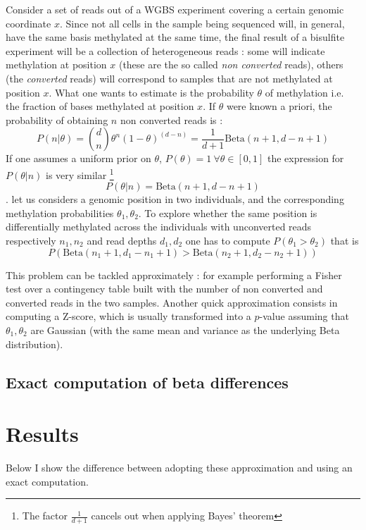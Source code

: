 \documentclass[11pt]{amsart}
\begin{document}
Consider a set of reads out of a WGBS experiment covering a certain genomic coordinate $x$. Since not all cells in the sample being sequenced will, in general,  have the same basis methylated at the same time, the final result of a bisulfite experiment will be a collection of heterogeneous reads : some will indicate methylation at position $x$ (these are the so called {\em non converted} reads), others (the {\em converted} reads) will correspond to samples that are not methylated at position $x$. What one wants to estimate is the probability $\theta$ of methylation i.e. the fraction of bases methylated at position $x$.  If $\theta$ were known a priori, the probability of obtaining $n$ non converted reads is :
\[P(n|\theta)={d \choose n}\theta^n ({1-\theta})^(d-n)=\frac{1}{d+1}\mbox{Beta}(n+1,d-n+1)\]
If one assumes a uniform prior on $\theta$, $P(\theta)=1 \ \forall \theta \in [0,1]$ the expression for $P(\theta|n)$ is very similar \footnote{The factor $\frac{1}{d+1}$ cancels out when applying Bayes' theorem}
\[P(\theta|n)=\mbox{Beta}(n+1,d-n+1)\].
let us considers a genomic position in two individuals, and the corresponding methylation probabilities $\theta_1,\theta_2$. 
To explore whether the same position is differentially methylated across the individuals with unconverted reads respectively $n_1,n_2$ and read depths $d_1,d_2$ one
has to compute $P(\theta_1>\theta_2)$ that is \[P(\mbox{Beta}(n_1+1,d_1-n_1+1)>\mbox{Beta}(n_2+1,d_2-n_2+1))\]
 
This problem can be tackled approximately :  for example performing a Fisher test over a contingency table built with the number of non converted and converted reads in the two samples. Another quick approximation consists in computing a Z-score, which is usually transformed into a $p$-value assuming that $\theta_1,\theta_2$ are Gaussian (with the same mean and variance as the underlying Beta distribution).  

\subsection{Exact computation of beta differences}



\section{Results} 
Below I show the difference between adopting these approximation and using an exact computation.
\end{document}
